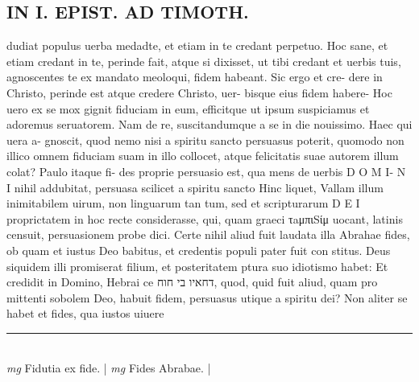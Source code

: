 \documentclass{article}
\begin{document}
\begin{pages}
\section*{IN I. EPIST. AD TIMOTH. }\pstart dudiat populus uerba medadte, et etiam in te credant perpetuo. Hoc sane, et etiam credant in te, perinde fait, atque si dixisset, ut tibi credant et uerbis tuis, agnoscentes te ex mandato meoloqui, fidem habeant. Sic ergo et cre- dere in Christo, perinde est atque credere Christo, uer- bisque eius fidem habere-  \pend\pstart Hoc uero ex se mox gignit fiduciam in eum, efficitque ut ipsum suspiciamus et adoremus seruatorem. Nam de re, suscitandumque a se in die nouissimo. Haec qui uera a- gnoscit, quod nemo nisi a spiritu sancto persuasus poterit, quomodo non illico omnem fiduciam suam in illo collocet, atque felicitatis suae autorem illum colat? Paulo itaque fi- des proprie persuasio est, qua mens de uerbis D O M I- N I nihil addubitat, persuasa scilicet a spiritu sancto Hinc liquet, Vallam illum inimitabilem uirum, non linguarum tan tum, sed et scripturarum D E I proprictatem in hoc recte considerasse, qui, quam graeci τaμπιSίμ uocant, latinis censuit, persuasionem probe dici.  \pend\pstart Certe nihil aliud fuit laudata illa Abrahae fides, ob quam et iustus Deo babitus, et credentis populi pater fuit con stitus.  Deus siquidem illi promiserat filium, et posteritatem ptura suo idiotismo habet: Et credidit in Domino, Hebrai ce דחאיו בי חוח, quod, quid fuit aliud, quam pro mittenti sobolem Deo, habuit fidem, persuasus utique a spiritu dei? Non aliter se habet et fides, qua iustos uiuere  \pend
\vspace{0.5cm}\noindent
\vspace{0.2cm}\rule{1cm}{0.2pt}\\ 
\hspace{0.2cm}\textit{mg}
\footnotesize Fidutia ex fide.  
\normalsize| 
\hspace{0.2cm}\textit{mg}
\footnotesize Fides Abrabae.  
\normalsize| 

\end{pages}
\end{document}
